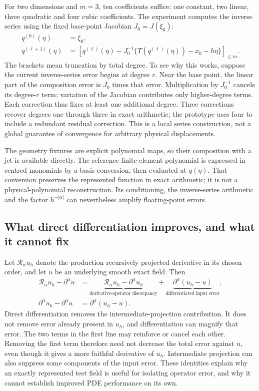 For two dimensions and $m=3$, ten coefficients suffice: one constant, two
linear, three quadratic and four cubic coefficients. The experiment computes
the inverse series using the fixed base-point Jacobian $J_0=J(\xi_0)$:
\begin{align}
 q^{(0)}(\eta)&=\xi_0,\\
 q^{(\ell+1)}(\eta)&=
 \left[q^{(\ell)}(\eta)-J_0^{-1}
 \{T(q^{(\ell)}(\eta))-x_0-h\eta\}\right]_{\le m}.
 \label{eq:app-inverse-iteration}
\end{align}
The brackets mean truncation by total degree. To see why this works,
suppose the current inverse-series error begins at degree $r$. Near the
base point, the linear part of the composition error is $J_0$ times that
error. Multiplication by $J_0^{-1}$ cancels its degree-$r$ term; variation
of the Jacobian contributes only higher-degree terms. Each correction thus
fixes at least one additional degree. Three corrections recover degrees
one through three in exact arithmetic; the prototype uses four to include
a redundant residual correction. This is a local series construction, not
a global guarantee of convergence for arbitrary physical displacements.

The geometry fixtures are explicit polynomial maps, so their composition
with a jet is available directly. The reference finite-element polynomial
is expressed in centred monomials by a basis conversion, then evaluated
at $q(\eta)$. That conversion preserves the represented function in exact
arithmetic; it is not a physical-polynomial reconstruction. Its conditioning,
the inverse-series arithmetic and the factor $h^{-|\alpha|}$ can nevertheless
amplify floating-point errors.

\subsection{What direct differentiation improves, and what it cannot fix}
Let $\mathcal R_\alpha u_h$ denote the production recursively projected
derivative in its chosen order, and let $u$ be an underlying smooth exact
field. Then
\begin{align}
 \mathcal R_\alpha u_h-\partial^\alpha u
 &=\underbrace{\mathcal R_\alpha u_h-\partial^\alpha u_h}
                 _{\text{derivative-operator discrepancy}}
   +\underbrace{\partial^\alpha(u_h-u)}
                 _{\text{differentiated input error}},\\
 \partial^\alpha u_h-\partial^\alpha u
 &=\partial^\alpha(u_h-u).
 \label{eq:app-error-split}
\end{align}
Direct differentiation removes the intermediate-projection contribution.
It does not remove error already present in $u_h$, and differentiation can
magnify that error. The two terms in the first line may reinforce or cancel
each other. Removing the first term therefore need not decrease the total
error against $u$, even though it gives a more faithful derivative of $u_h$.
Intermediate projection can also suppress some components of the input error.
These identities explain why an exactly represented test field is useful
for isolating operator error, and why it cannot establish improved PDE
performance on its own.

